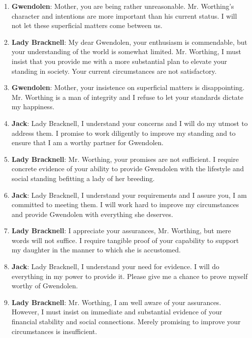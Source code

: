 \documentclass[10pt]{article}
\begin{document}
\begin{enumerate}
\item \textbf{Gwendolen}: Mother, you are being rather unreasonable. Mr. Worthing's character and intentions are more important than his current status. I will not let these superficial matters come between us.

\item \textbf{Lady Bracknell}: My dear Gwendolen, your enthusiasm is commendable, but your understanding of the world is somewhat limited. Mr. Worthing, I must insist that you provide me with a more substantial plan to elevate your standing in society. Your current circumstances are not satisfactory.

\item \textbf{Gwendolen}: Mother, your insistence on superficial matters is disappointing. Mr. Worthing is a man of integrity and I refuse to let your standards dictate my happiness.

\item \textbf{Jack}: Lady Bracknell, I understand your concerns and I will do my utmost to address them. I promise to work diligently to improve my standing and to ensure that I am a worthy partner for Gwendolen.

\item \textbf{Lady Bracknell}: Mr. Worthing, your promises are not sufficient. I require concrete evidence of your ability to provide Gwendolen with the lifestyle and social standing befitting a lady of her breeding.

\item \textbf{Jack}: Lady Bracknell, I understand your requirements and I assure you, I am committed to meeting them. I will work hard to improve my circumstances and provide Gwendolen with everything she deserves.

\item \textbf{Lady Bracknell}: I appreciate your assurances, Mr. Worthing, but mere words will not suffice. I require tangible proof of your capability to support my daughter in the manner to which she is accustomed.

\item \textbf{Jack}: Lady Bracknell, I understand your need for evidence. I will do everything in my power to provide it. Please give me a chance to prove myself worthy of Gwendolen.

\item \textbf{Lady Bracknell}: Mr. Worthing, I am well aware of your assurances. However, I must insist on immediate and substantial evidence of your financial stability and social connections. Merely promising to improve your circumstances is insufficient.


\end{enumerate}
\end{document}
